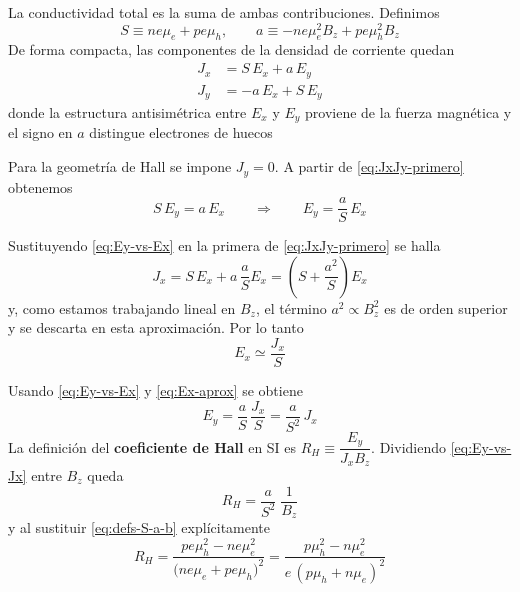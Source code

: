 \documentclass{article}
\begin{document}
La conductividad total es la suma de ambas contribuciones. Definimos
\begin{equation}\label{eq:defs-S-a-b}
S\equiv ne\mu_e+pe\mu_h,\qquad 
a\equiv -ne\mu_e^{2}B_z+pe\mu_h^{2}B_z
\end{equation}
De forma compacta, las componentes de la densidad de corriente quedan
\begin{equation}\label{eq:JxJy-primero}
\begin{aligned}
J_x&=S\,E_x+a\,E_y\\
J_y&=-a\,E_x+S\,E_y
\end{aligned}
\end{equation}
donde la estructura antisimétrica entre $E_x$ y $E_y$ proviene de la fuerza magnética y el signo en $a$ distingue electrones de huecos

Para la geometría de Hall se impone $J_y=0$. A partir de \eqref{eq:JxJy-primero} obtenemos
\begin{equation}\label{eq:Ey-vs-Ex}
S\,E_y=a\,E_x
\qquad\Rightarrow\qquad
E_y=\frac{a}{S}\,E_x
\end{equation}

Sustituyendo \eqref{eq:Ey-vs-Ex} en la primera de \eqref{eq:JxJy-primero} se halla
\begin{equation}\label{eq:Jx-vs-Ex}
J_x=S\,E_x+a\,\frac{a}{S}E_x
= \left(S+\frac{a^2}{S}\right)E_x
\end{equation}
y, como estamos trabajando lineal en $B_z$, el término $a^2\propto B_z^2$ es de orden superior y se descarta en esta aproximación. Por lo tanto
\begin{equation}\label{eq:Ex-aprox}
E_x\simeq \frac{J_x}{S}
\end{equation}

Usando \eqref{eq:Ey-vs-Ex} y \eqref{eq:Ex-aprox} se obtiene
\begin{equation}\label{eq:Ey-vs-Jx}
E_y=\frac{a}{S}\,\frac{J_x}{S}
=\frac{a}{S^{2}}\,J_x
\end{equation}
La definición del \textcolor{Cerulean}{\textbf{coeficiente de Hall}} en SI es $R_H\equiv\dfrac{E_y}{J_x B_z}$. Dividiendo \eqref{eq:Ey-vs-Jx} entre $B_z$ queda
\begin{equation}\label{eq:RH-pre}
R_H=\frac{a}{S^{2}}\;\frac{1}{B_z}
\end{equation}
y al sustituir \eqref{eq:defs-S-a-b} explícitamente
\begin{equation}\label{eq:RH-SI-final}
R_H=\frac{p e \mu_h^{2}-n e \mu_e^{2}}{\big(ne\mu_e+pe\mu_h\big)^{2}}
=\frac{p\mu_h^{2}-n\mu_e^{2}}{e\,(p\mu_h+n\mu_e)^{2}}
\end{equation}
\end{document}
